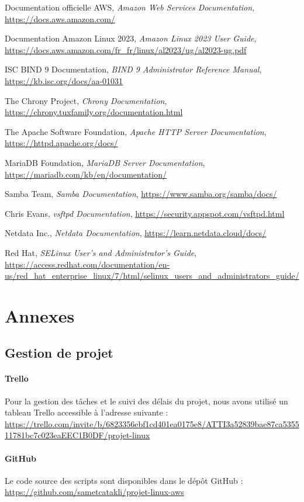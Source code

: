 \documentclass[a4paper,12pt]{article}
\begin{document}
\begin{thebibliography}{9}
 Documentation officielle AWS, \textit{Amazon Web Services Documentation}, \url{https://docs.aws.amazon.com/}

 Documentation Amazon Linux 2023, \textit{Amazon Linux 2023 User Guide}, \url{https://docs.aws.amazon.com/fr_fr/linux/al2023/ug/al2023-ug.pdf}

 ISC BIND 9 Documentation, \textit{BIND 9 Administrator Reference Manual}, \url{https://kb.isc.org/docs/aa-01031}

 The Chrony Project, \textit{Chrony Documentation}, \url{https://chrony.tuxfamily.org/documentation.html}

 The Apache Software Foundation, \textit{Apache HTTP Server Documentation}, \url{https://httpd.apache.org/docs/}

 MariaDB Foundation, \textit{MariaDB Server Documentation}, \url{https://mariadb.com/kb/en/documentation/}

 Samba Team, \textit{Samba Documentation}, \url{https://www.samba.org/samba/docs/}

 Chris Evans, \textit{vsftpd Documentation}, \url{https://security.appspot.com/vsftpd.html}

 Netdata Inc., \textit{Netdata Documentation}, \url{https://learn.netdata.cloud/docs/}

 Red Hat, \textit{SELinux User's and Administrator's Guide}, \url{https://access.redhat.com/documentation/en-us/red_hat_enterprise_linux/7/html/selinux_users_and_administrators_guide/}
\end{thebibliography}

\section{Annexes}

\subsection{Gestion de projet}

\paragraph{Trello}
Pour la gestion des tâches et le suivi des délais du projet, nous avons utilisé un tableau Trello accessible à l'adresse suivante :\\ \url{https://trello.com/invite/b/6823356ebf1cd401ea0175e8/ATTI3a52839bae87ca535511781bc7c023eaEEC1B0DF/projet-linux}

\paragraph{GitHub}
Le code source des scripts sont disponibles dans le dépôt GitHub :\\ \url{https://github.com/sametcatakli/projet-linux-aws}
\end{document}
